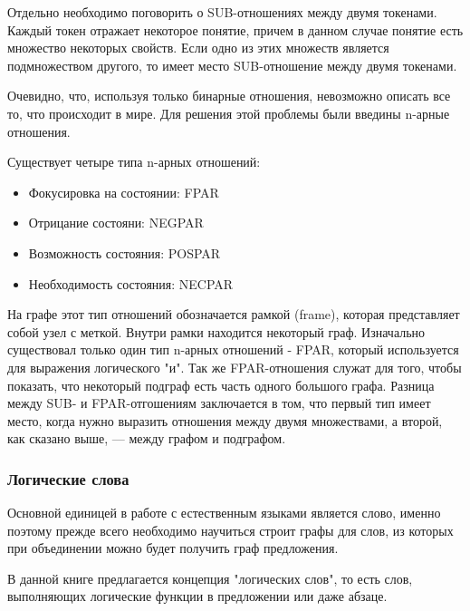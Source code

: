 Отдельно необходимо поговорить о SUB-отношениях между двумя токенами. Каждый токен отражает некоторое 
понятие, причем в данном случае понятие есть множество некоторых свойств. Если одно из этих  множеств 
является подмножеством другого, то имеет место SUB-отношение между двумя токенами.
 
Очевидно, что, используя только бинарные отношения, невозможно описать все то, что происходит в мире.
Для решения этой проблемы были введины n-арные отношения. 

Существует четыре типа n-арных отношений:

\begin {itemize}

\item{
Фокусировка на состоянии: FPAR
}

\item{
Отрицание состояни: NEGPAR
}

\item{
Возможность состояния: POSPAR 
}

\item{
Необходимость состояния: NECPAR
}
\end{itemize}

На графе этот тип отношений обозначается рамкой (frame), которая представляет собой  узел с меткой. Внутри рамки %
находится некоторый граф.
Изначально существовал только один тип n-арных отношений - FPAR, который используется для выражения логического "и".
Так же FPAR-отношения служат для того, чтобы показать, что некоторый подграф есть часть одного большого графа. Разница
между SUB- и FPAR-отгошениям заключается в том, что первый тип имеет место, когда нужно выразить отношения между двумя
множествами, а второй, как сказано выше, --- между графом и подграфом.


\subsubsection {Логические слова}
Основной единицей в работе с естественным языками является слово, именно поэтому прежде всего необходимо научиться 
строит графы для слов, из которых при объединении можно будет получить граф предложения.

В данной книге предлагается концепция "логических слов", то есть слов, выполняющих логические функции в предложении
или даже абзаце.

